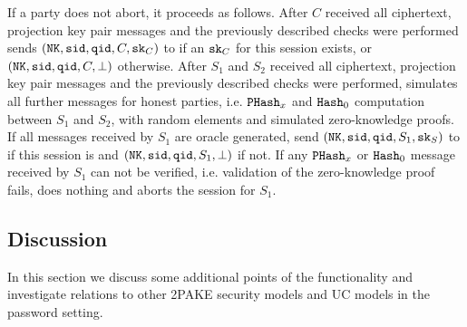 \noindent              
        If a party does not abort, it proceeds as follows.
        After $C$ received all ciphertext, projection key pair messages and the previously described checks were performed \SIM sends $(\mathtt{NK}, \mathtt{sid}, \mathtt{qid}, C, \mathtt{sk}_C)$ to \FTWOPAKE if an $\mathtt{sk}_C$ for this session exists, or $(\mathtt{NK}, \mathtt{sid}, \mathtt{qid}, C, \bot)$ otherwise.
        After $S_1$ and $S_2$ received all ciphertext, projection key pair messages and the previously described checks were performed, \SIM simulates all further messages for honest parties, i.e. $\mathtt{PHash}_x$ and $\mathtt{Hash}_0$ computation between $S_1$ and $S_2$, with random elements and simulated zero-knowledge proofs.
        If all messages received by $S_1$ are oracle generated, send $(\mathtt{NK}, \mathtt{sid}, \mathtt{qid}, S_1, \mathtt{sk}_S)$ to \FTWOPAKE if this session is \compromised and $(\mathtt{NK}, \mathtt{sid}, \mathtt{qid}, S_1, \bot)$ if not.
        If any $\mathtt{PHash}_x$ or $\mathtt{Hash}_0$ message received by $S_1$ can not be verified, i.e. validation of the zero-knowledge proof fails, \SIM does nothing and aborts the session for $S_1$.
        
        

\subsection{\FTWOPAKE Discussion}\label{app:relations}
In this section we discuss some additional points of the \FTWOPAKE functionality and investigate relations to other 2PAKE security models and UC models in the password setting.

